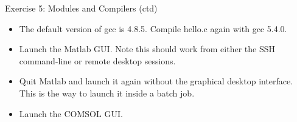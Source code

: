 \documentclass{beamer}
\begin{document}
\begin{frame}{Exercise 5: Modules and Compilers (ctd)}
  \begin{itemize}
  \item{The default version of gcc is 4.8.5. Compile hello.c again with \alert{gcc 5.4.0}.}
\item{Launch the Matlab GUI. Note this should work from either the SSH command-line or remote desktop sessions.}
\item{Quit Matlab and launch it again without the graphical desktop interface. This is the way to launch it inside a batch job.}
\item{Launch the COMSOL GUI.}
\end{itemize}
\end{frame}
\end{document}
